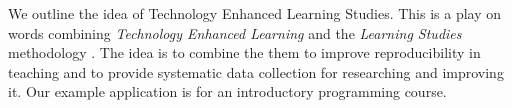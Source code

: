 
We outline the idea of Technology Enhanced Learning Studies.
This is a play on words combining \emph{Technology Enhanced Learning} and the 
\emph{Learning Studies} methodology \parencite{LearningStudy}.
The idea is to combine the them to improve reproducibility in teaching and to 
provide systematic data collection for researching and improving it.
Our example application is for an introductory programming course.

